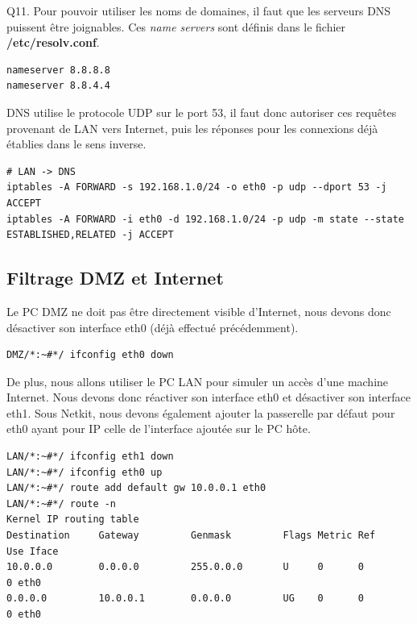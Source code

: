 \documentclass[frenchb, 11pt]{article}
\newlength{\leftbarwidth}
\newlength{\leftbarsep}
\newcommand*{\leftbarcolorcmd}{\color{leftbarcolor}} %
\renewenvironment{leftbar}{%
    \def\FrameCommand{{\leftbarcolorcmd{\vrule width \leftbarwidth\relax\hspace {\leftbarsep}}}}%
    \MakeFramed {\advance \hsize -\width \FrameRestore }%
}{%
    \endMakeFramed
}
\begin{document}
\begin{leftbar}
	\noindent Q11. Pour pouvoir utiliser les noms de domaines, il faut que les serveurs DNS puissent être joignables. Ces \emph{name servers} sont définis dans le fichier \textbf{/etc/resolv.conf}.
	\begin{lstlisting}[caption=Exemple de nameservers (Google Public DNS) dans /etc/resolv.conf, numbers=none]
nameserver 8.8.8.8
nameserver 8.8.4.4
	\end{lstlisting}
	DNS utilise le protocole UDP sur le port 53, il faut donc autoriser ces requêtes provenant de LAN vers Internet, puis les réponses pour les connexions déjà établies dans le sens inverse.
	\begin{lstlisting}[numbers=none]
# LAN -> DNS
iptables -A FORWARD -s 192.168.1.0/24 -o eth0 -p udp --dport 53 -j ACCEPT
iptables -A FORWARD -i eth0 -d 192.168.1.0/24 -p udp -m state --state ESTABLISHED,RELATED -j ACCEPT
	\end{lstlisting}
\end{leftbar}

\subsection{Filtrage DMZ et Internet}
Le PC DMZ ne doit pas être directement visible d'Internet, nous devons donc désactiver son interface eth0 (déjà effectué précédemment).
\begin{lstlisting}
DMZ/*:~#*/ ifconfig eth0 down
\end{lstlisting}
De plus, nous allons utiliser le PC LAN pour simuler un accès d'une machine Internet. Nous devons donc réactiver son interface eth0 et désactiver son interface eth1. Sous Netkit, nous devons également ajouter la passerelle par défaut pour eth0 ayant pour IP celle de l'interface ajoutée sur le PC hôte.
\begin{lstlisting}
LAN/*:~#*/ ifconfig eth1 down
LAN/*:~#*/ ifconfig eth0 up
LAN/*:~#*/ route add default gw 10.0.0.1 eth0
LAN/*:~#*/ route -n
Kernel IP routing table
Destination     Gateway         Genmask         Flags Metric Ref    Use Iface
10.0.0.0        0.0.0.0         255.0.0.0       U     0      0        0 eth0
0.0.0.0         10.0.0.1        0.0.0.0         UG    0      0        0 eth0
\end{lstlisting}
\end{document}
